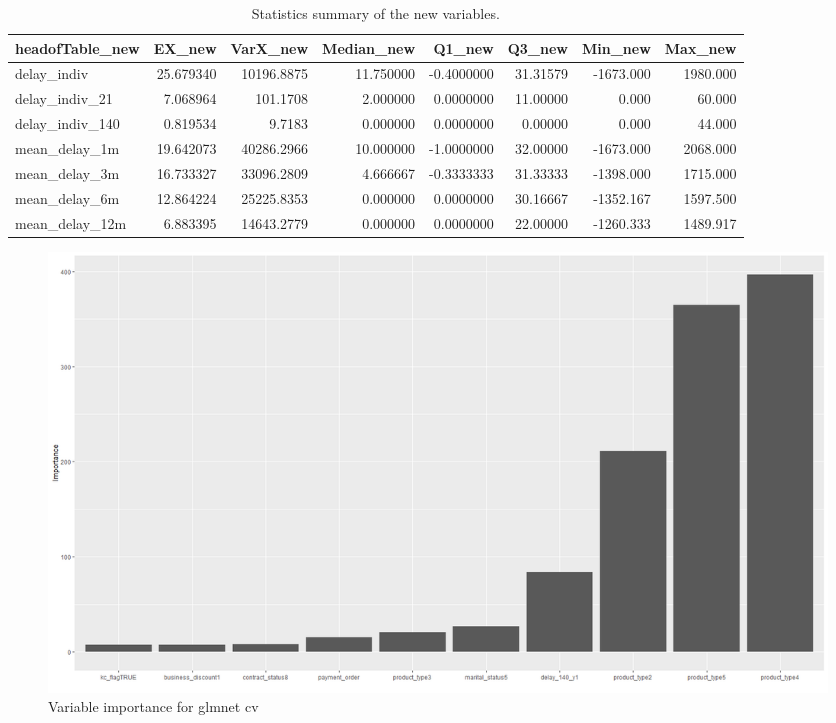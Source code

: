 \documentclass[
]{article}
\begin{document}
\begin{table}

\caption{\label{tab:Statss}Statistics summary of the new variables.}
\centering
\begin{tabular}[t]{l|r|r|r|r|r|r|r}
\hline
headofTable\_new & EX\_new & VarX\_new & Median\_new & Q1\_new & Q3\_new & Min\_new & Max\_new\\
\hline
delay\_indiv & 25.679340 & 10196.8875 & 11.750000 & -0.4000000 & 31.31579 & -1673.000 & 1980.000\\
\hline
delay\_indiv\_21 & 7.068964 & 101.1708 & 2.000000 & 0.0000000 & 11.00000 & 0.000 & 60.000\\
\hline
delay\_indiv\_140 & 0.819534 & 9.7183 & 0.000000 & 0.0000000 & 0.00000 & 0.000 & 44.000\\
\hline
mean\_delay\_1m & 19.642073 & 40286.2966 & 10.000000 & -1.0000000 & 32.00000 & -1673.000 & 2068.000\\
\hline
mean\_delay\_3m & 16.733327 & 33096.2809 & 4.666667 & -0.3333333 & 31.33333 & -1398.000 & 1715.000\\
\hline
mean\_delay\_6m & 12.864224 & 25225.8353 & 0.000000 & 0.0000000 & 30.16667 & -1352.167 & 1597.500\\
\hline
mean\_delay\_12m & 6.883395 & 14643.2779 & 0.000000 & 0.0000000 & 22.00000 & -1260.333 & 1489.917\\
\hline
\end{tabular}
\end{table}
\begin{figure}
\includegraphics[width=0.9\linewidth]{delay_varImp} \caption{\label{fig:missing-H}Variable importance for glmnet cv}\label{fig:varIm}
\end{figure}
\end{document}
